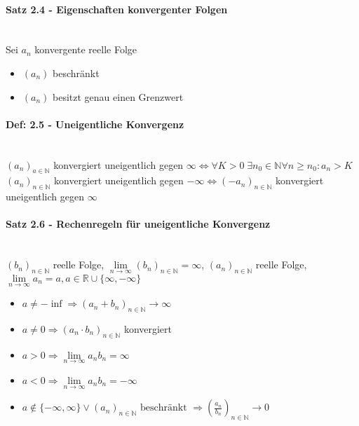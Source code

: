 \documentclass[paper=a3,paper=landscape, fontsize=9pt,DIV=25]{scrartcl}
\newcommand{\real}{{\mathbb{R}}}
\newcommand{\nat}{\mathbb{N}}
\newcommand{\aseq}{(a_n)_{n \in \nat}}
\begin{document}
\begin{multicols*}{4}
  \paragraph{Satz 2.4 - Eigenschaften konvergenter Folgen}\hspace{0pt} \\
  Sei $a_n$ konvergente reelle Folge
  \begin{itemize}
  \item $(a_n)$ beschränkt
  \item $(a_n)$ besitzt genau einen Grenzwert
  \end{itemize}


  \paragraph{Def: 2.5 - Uneigentliche Konvergenz}\hspace{0pt} \\
  $(a_n)_{a \in \nat}$ konvergiert uneigentlich gegen $\infty \Leftrightarrow \forall K > 0 \; \exists n_0 \in \nat \forall n \geq n_0: a_n > K$\\
  $\aseq$ konvergiert uneigentlich gegen $-\infty \Leftrightarrow (-a_n)_{n \in \nat}$ konvergiert uneigentlich gegen $\infty$

  \paragraph{Satz 2.6 - Rechenregeln für uneigentliche Konvergenz}\hspace{0pt} \\
  $(b_n)_{n \in \nat}$ reelle Folge, $\lim\limits_{n \rightarrow \infty} (b_n)_{n \in \nat} = \infty$, $\aseq$ reelle Folge, $\lim\limits_{n \rightarrow \infty} a_n = a, a \in \real \cup \{\infty, -\infty\}$

  \begin{itemize}
  \item $a \neq -\inf \Rightarrow (a_n+b_n)_{n \in \nat} \rightarrow \infty$
  \item $a \neq 0 \Rightarrow (a_n \cdot b_n)_{n \in \nat}$ konvergiert
  \item $a > 0 \Rightarrow \lim\limits_{n \rightarrow \infty} a_nb_n = \infty$
  \item $a < 0 \Rightarrow \lim\limits_{n \rightarrow \infty} a_nb_n = -\infty$
  \item $a \notin \{-\infty, \infty\} \vee\aseq \text{ beschränkt } \Rightarrow (\frac{a_n}{b_n})_{n \in \nat} \rightarrow 0$
  \end{itemize}


\end{multicols*}
\end{document}
